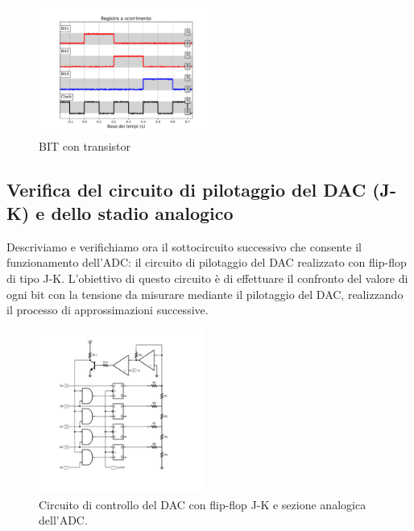 \documentclass[journal]{IEEEtran}
\begin{document}
\begin{figure}[H]%
\begin{center}
\includegraphics[trim = {0 0 0 0}, clip, width=0.50\textwidth]{analysis/output/reg_test.pdf}
\caption{BIT con transistor}
\label{fig:BIT_with_transistor}
\end{center}
\end{figure}

\subsection{Verifica del circuito di pilotaggio del DAC (J-K) e dello stadio analogico}
Descriviamo e verifichiamo ora il sottocircuito successivo che consente il funzionamento dell'ADC: il circuito di pilotaggio del DAC realizzato con flip-flop di tipo J-K. L'obiettivo di questo circuito è di effettuare il confronto del valore di ogni bit con la tensione da misurare mediante il pilotaggio del DAC, realizzando il processo di approssimazioni successive. 

\begin{figure}[H]%
\begin{center}
\includegraphics[width=0.48\textwidth]{sch-simulations/digital/output/DAC.pdf}
\caption{Circuito di controllo del DAC con flip-flop J-K e sezione analogica dell'ADC.}
\label{fig:circuit_DAC}
\end{center}
\end{figure}
\end{document}
